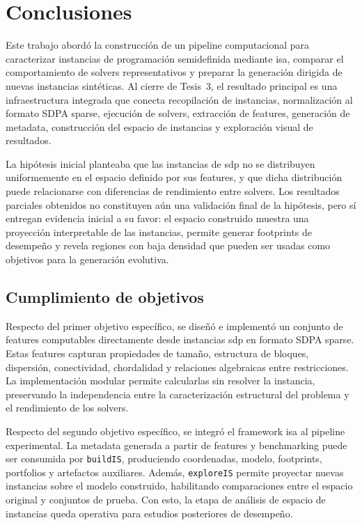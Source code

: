 \chapter{Conclusiones}
\label{ch:conclu}

Este trabajo abordó la construcción de un pipeline computacional para caracterizar
instancias de programación semidefinida mediante \acrshort{isa}, comparar el
comportamiento de solvers representativos y preparar la generación dirigida de nuevas
instancias sintéticas.
Al cierre de Tesis~3, el resultado principal es una infraestructura integrada que
conecta recopilación de instancias, normalización al formato SDPA sparse, ejecución de
solvers, extracción de features, generación de metadata, construcción del espacio de
instancias y exploración visual de resultados.

La hipótesis inicial planteaba que las instancias de \acrshort{sdp} no se distribuyen
uniformemente en el espacio definido por sus features, y que dicha distribución puede
relacionarse con diferencias de rendimiento entre solvers.
Los resultados parciales obtenidos no constituyen aún una validación final de la
hipótesis, pero sí entregan evidencia inicial a su favor: el espacio construido muestra
una proyección interpretable de las instancias, permite generar footprints de
desempeño y revela regiones con baja densidad que pueden ser usadas como objetivos
para la generación evolutiva.

\section{Cumplimiento de objetivos}
\label{sec:conclusiones_objetivos}

Respecto del primer objetivo específico, se diseñó e implementó un conjunto de
features computables directamente desde instancias \acrshort{sdp} en formato SDPA
sparse.
Estas features capturan propiedades de tamaño, estructura de bloques, dispersión,
conectividad, chordalidad y relaciones algebraicas entre restricciones.
La implementación modular permite calcularlas sin resolver la instancia, preservando
la independencia entre la caracterización estructural del problema y el rendimiento de
los solvers.

Respecto del segundo objetivo específico, se integró el framework \acrshort{isa} al
pipeline experimental.
La metadata generada a partir de features y benchmarking puede ser consumida por
\texttt{buildIS}, produciendo coordenadas, modelo, footprints, portfolios y artefactos
auxiliares.
Además, \texttt{exploreIS} permite proyectar nuevas instancias sobre el modelo
construido, habilitando comparaciones entre el espacio original y conjuntos de prueba.
Con esto, la etapa de análisis de espacio de instancias queda operativa para estudios
posteriores de desempeño.

